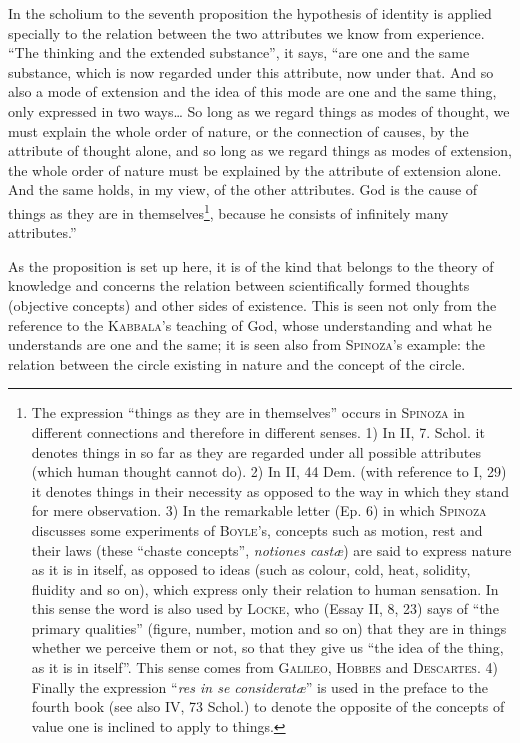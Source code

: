 \documentclass[12pt]{article}
\newcommand{\opage}[1]{\marginnote{\footnotesize\textit{[#1]}}}
\begin{document}
In the scholium to the seventh proposition the hypothesis of identity is applied specially
to the relation between the two attributes we know from experience. ``The thinking and the
extended substance'', it says, ``are one and the same substance, which is now regarded under
this attribute, now under that. And so also a mode of extension and the idea of this mode
are one and the same thing, only expressed in two ways\dots{} So long as we regard things
as modes of thought, we must explain the whole order of nature, or the connection of
causes, by the attribute of thought alone, and so long as we regard things as modes of
extension, the whole order of nature must be explained by the attribute of extension alone.
And the same holds, in my view, of the other attributes. God is the cause of things as they
are in themselves\footnote{The expression ``things as they are in themselves'' occurs in
\textsc{Spinoza} in different connections and therefore in different senses. 1) In II, 7.
Schol. it denotes things in so far as they are regarded under all possible attributes
(which human thought cannot do). 2) In II, 44 Dem. (with reference to I, 29) it denotes
things in their necessity as opposed to the way in which they stand for mere observation.
3) In the remarkable letter (Ep. 6) in which \textsc{Spinoza} discusses some experiments of
\textsc{Boyle}'s, concepts such as motion, rest and their laws (these ``chaste concepts'',
\textit{notiones castæ}) are said to express nature as it is in itself, as opposed to ideas
(such as colour, cold, heat, solidity, fluidity and so on), which express only their relation
to human sensation. In this sense the word is also used by \textsc{Locke}, who (Essay II,
8, 23) says of ``the primary qualities'' (figure, number, motion and so on) that they are in
things whether we perceive them or not, so that they give us ``the idea of the thing, as it
is in itself''. This sense comes from \textsc{Galileo}, \textsc{Hobbes} and
\textsc{Descartes}. 4) Finally the expression ``\textit{res in se consideratæ}'' is used in
the preface to the fourth book (see also IV, 73 Schol.) to denote the opposite of the
concepts of value one is inclined to apply to things.}, because he consists of infinitely
many attributes.''

\opage{41}As the proposition is set up here, it is of the kind that belongs to the theory
of knowledge and concerns the relation between scientifically formed thoughts (objective
concepts) and other sides of existence. This is seen not only from the reference to the
\textsc{Kabbala}'s teaching of God, whose understanding and what he understands are one and
the same; it is seen also from \textsc{Spinoza}'s example: the relation between the circle
existing in nature and the concept of the circle.
\end{document}
